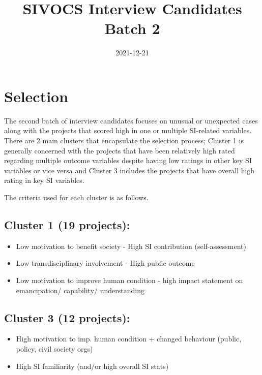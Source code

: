 \documentclass[]{tufte-book}
\title[Selection Criteria]{SIVOCS Interview Candidates \textbar{} Batch
2}
\date{2021-12-21}
\providecommand{\tightlist}{%
  \setlength{\itemsep}{0pt}\setlength{\parskip}{0pt}}
\begin{document}
\maketitle




\hypertarget{selection}{%
\chapter{Selection}\label{selection}}

The second batch of interview candidates focuses on unusual or
unexpected cases along with the projects that scored high in one or
multiple SI-related variables. There are 2 main clusters that
encapsulate the selection process; Cluster 1 is generally concerned with
the projects that have been relatively high rated regarding multiple
outcome variables despite having low ratings in other key SI variables
or vice versa and Cluster 3 includes the projects that have overall high
rating in key SI variables.

The criteria used for each cluster is as follows.

\hypertarget{cluster-1-19-projects}{%
\section{Cluster 1 (19 projects):}\label{cluster-1-19-projects}}

\begin{itemize}
\tightlist
\item
  Low motivation to benefit society - High SI contribution
  (self-assessment)
\item
  Low transdisciplinary involvement - High public outcome
\item
  Low motivation to improve human condition - high impact statement on
  emancipation/ capability/ understanding
\end{itemize}

\hypertarget{cluster-3-12-projects}{%
\section{Cluster 3 (12 projects):}\label{cluster-3-12-projects}}

\begin{itemize}
\tightlist
\item
  High motivation to imp. human condition + changed behaviour (public,
  policy, civil society orgs)
\item
  High SI familiarity (and/or high overall SI stats)
\end{itemize}
\end{document}
